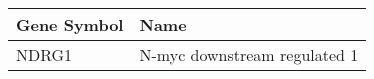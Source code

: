 \begin{tabular}{ll}
\toprule
Gene Symbol &                         Name \\
\midrule
      NDRG1 & N-myc downstream regulated 1 \\
\bottomrule
\end{tabular}
